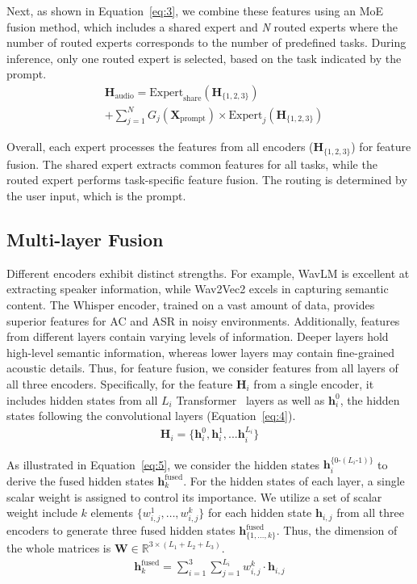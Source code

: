 \noindent Next, as shown in Equation~\ref{eq:3}, we combine these features using an MoE fusion method, which includes a shared expert and \textit{N} routed experts where the number of routed experts corresponds to the number of predefined tasks. During inference, only one routed expert is selected, based on the task indicated by the prompt. 
 \begin{align}
 \label{eq:3}
  &\mathbf{H}_\text{audio} = \text{Expert}_\text{share}(\mathbf{H}_{\{1,2,3\}}) \nonumber \\&+ \sum_{j=1}^{N}G_j(\mathbf{X}_\text{prompt})\times\text{Expert}_j(\mathbf{H}_{\{1,2,3\}})
\end{align}

\noindent Overall, each expert processes the features from all encoders ($\mathbf{H}_{\{1,2,3\}}$) for feature fusion. The shared expert extracts common features for all tasks, while the routed expert performs task-specific feature fusion. The routing is determined by the user input, which is the prompt.

\subsection{Multi-layer Fusion}

Different encoders exhibit distinct strengths. For example, WavLM is excellent at extracting speaker information, while Wav2Vec2 excels in capturing semantic content. The Whisper encoder, trained on a vast amount of data, provides superior features for AC and ASR in noisy environments. Additionally, features from different layers contain varying levels of information. Deeper layers hold high-level semantic information, whereas lower layers may contain fine-grained acoustic details. Thus, for feature fusion, we consider features from all layers of all three encoders. Specifically, for the feature $\mathbf{H}_i$ from a single encoder, it includes hidden states from all $L_i$ Transformer~\cite{NIPS2017_3f5ee243} layers as well as $\mathbf{h}_i^{0}$, the hidden states following the convolutional layers (Equation~\ref{eq:4}).
\begin{align}
 \mathbf{H}_{i} = \{\mathbf{h}_i^{0}, \mathbf{h}_i^{1}, ... \mathbf{h}_i^{L_i}\}
  \label{eq:4}
\end{align}

\noindent As illustrated in Equation~\ref{eq:5}, we consider the hidden states $\mathbf{h}_i^{\{0\text{-}(L_i\text{-}1)\}}$ to derive the fused hidden states $\mathbf{h}_{k}^\text{fused}$. For the hidden states of each layer, a single scalar weight is assigned to control its importance. We utilize a set of scalar weight include $k$ elements $\{w_{i,j}^1, \ldots, w_{i,j}^k\}$ for each hidden state $\mathbf{h}_{i, j}$ from all three encoders to generate three fused hidden states $\mathbf{h}_{\{1,\ldots,k\}}^\text{fused}$. Thus, the dimension of the whole matrices is $\mathbf{W} \in \mathbb{R}^{3\times(L_1 + L_2 + L_3)}$.
\begin{align}
 \label{eq:5}
 \mathbf{h}_{k}^\text{fused} = \sum_{i=1}^3 \sum_{j=1}^{L_i} w_{i,j}^k \cdot \mathbf{h}_{i, j}
\end{align}


